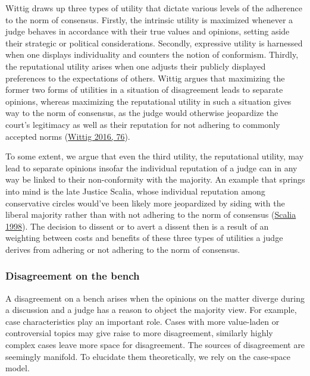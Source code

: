 \documentclass[
  11pt,
]{article}
\begin{document}
Wittig draws up three types of utility that dictate various levels of
the adherence to the norm of consensus. Firstly, the intrinsic utility
is maximized whenever a judge behaves in accordance with their true
values and opinions, setting aside their strategic or political
considerations. Secondly, expressive utility is harnessed when one
displays individuality and counters the notion of conformism. Thirdly,
the reputational utility arises when one adjusts their publicly
displayed preferences to the expectations of others. Wittig argues that
maximizing the former two forms of utilities in a situation of
disagreement leads to separate opinions, whereas maximizing the
reputational utility in such a situation gives way to the norm of
consensus, as the judge would otherwise jeopardize the court's
legitimacy as well as their reputation for not adhering to commonly
accepted norms
(\protect\hyperlink{ref-wittigOccurrenceSeparateOpinions2016}{Wittig
2016, 76}).

To some extent, we argue that even the third utility, the reputational
utility, may lead to separate opinions insofar the individual reputation
of a judge can in any way be linked to their non-conformity with the
majority. An example that springs into mind is the late Justice Scalia,
whose individual reputation among conservative circles would've been
likely more jeopardized by siding with the liberal majority rather than
with not adhering to the norm of consensus
(\protect\hyperlink{ref-scaliaDissents1998}{Scalia 1998}). The decision
to dissent or to avert a dissent then is a result of an weighting
between costs and benefits of these three types of utilities a judge
derives from adhering or not adhering to the norm of consensus.

\hypertarget{disagreement-on-the-bench}{%
\subsubsection{Disagreement on the
bench}\label{disagreement-on-the-bench}}

A disagreement on a bench arises when the opinions on the matter diverge
during a discussion and a judge has a reason to object the majority
view. For example, case characteristics play an important role. Cases
with more value-laden or controversial topics may give raise to more
disagreement, similarly highly complex cases leave more space for
disagreement. The sources of disagreement are seemingly manifold. To
elucidate them theoretically, we rely on the case-space model.
\end{document}
